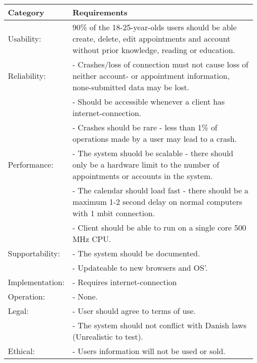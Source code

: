 {\tabulinesep=1.2mm
\begin{tabu}{ | p{3cm} | p{13cm} |}
    \hline
    Category	 			& 		Requirements \\\hline
    Usability:	  			& 		90\% of the 18-25-year-olds users should be able create, delete, edit appointments and account without prior knowledge, reading or education. \\\hline
    Reliability: 			& 		- Crashes/loss of connection must not cause loss of neither account- or appointment information, none-submitted data may be lost. \\
							&		- Should be accessible whenever a client has internet-connection.\\
							&		- Crashes should be rare - less than 1\% of operations made by a user may lead to a crash. \\ \hline
	Performance:			&		- The system shuold be scalable - there should only be a hardware limit to the number of appointments or accounts in the system.\\
							&		- The calendar should load fast - there should be a maximum 1-2 second delay on normal computers with 1 mbit connection.\\
							&		- Client should be able to run on a single core 500 MHz CPU.\\ \hline
    Supportability: 		& 		- The system should be documented.  \\
    						&		- Updateable to new browsers and OS'. \\ \hline
	Implementation: 		&		- Requires internet-connection\\\hline
	Operation:				&	 	- None. \\\hline
	Legal:					&		- User should agree to terms of use.\\
							&		- The system should not conflict with Danish laws (Unrealistic to test).\\\hline
	Ethical:				&		- Users information will not be used or sold.\\\hline
\end{tabu}
}